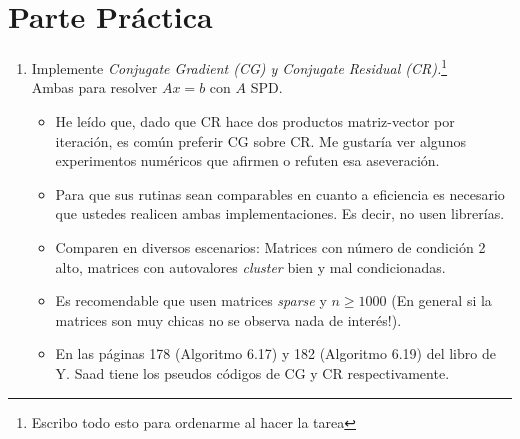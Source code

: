 \documentclass{article}
\begin{document}
\section*{Parte Práctica}
\begin{enumerate}
\item Implemente \textit{Conjugate Gradient (CG) y Conjugate Residual (CR).}\footnote{Escribo todo esto para ordenarme al hacer la tarea}\\
Ambas para resolver $Ax=b$ con $A$ SPD.
\begin{itemize}
\item He leído que, dado que CR hace dos productos matriz-vector por iteración, es común preferir CG sobre CR. Me gustaría ver algunos experimentos numéricos que afirmen o refuten esa aseveración.
\item Para que sus rutinas sean comparables en cuanto a eficiencia es necesario que ustedes realicen ambas implementaciones. Es decir, no usen librerías.
\item Comparen en diversos escenarios: Matrices con número de condición 2 alto, matrices con autovalores \textit{cluster} bien y mal condicionadas.
\item Es recomendable que usen matrices \textit{sparse} y $n\geq 1000$ (En general si la matrices son muy chicas no se observa nada de interés!).
\item En las páginas 178 (Algoritmo 6.17) y 182 (Algoritmo 6.19) del libro de Y. Saad tiene los pseudos códigos de CG y CR respectivamente.

\end{itemize}
\end{enumerate}
\end{document}
